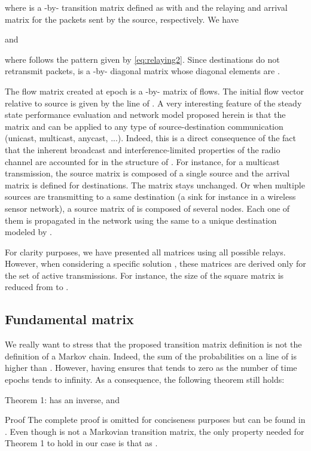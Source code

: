 \documentclass[a4paper]{article}
\begin{document}
       
\noindent where  is a -by- transition matrix defined as  with  and  the relaying and arrival matrix for the packets sent by the source, respectively. We have 
       
\noindent and 
       
\noindent where  follows the pattern given by \eqref{eq:relaying2}. Since destinations do not retransmit packets,  is a -by- diagonal matrix whose diagonal elements are .

The flow matrix  created at epoch  is a -by- matrix of flows. The initial flow vector  relative to source  is given by the  line of . 
A very interesting feature of the steady state performance evaluation and network model proposed herein is that the matrix  and  can be applied to any type of source-destination communication (unicast, multicast, anycast, ...). Indeed, this is a direct consequence of the fact that the inherent broadcast and interference-limited properties of the radio channel are accounted for in the structure of .  
For instance, for a multicast transmission, the source matrix  is composed of a single source and the arrival matrix   is defined for   destinations. The matrix  stays unchanged.
Or when multiple sources are transmitting to a same destination (a sink for instance in a wireless sensor network), a source matrix of  is composed of several nodes. Each one of them is propagated in the network using the same  to a unique destination modeled by .  

For clarity purposes, we have presented all matrices using all  possible relays. However, when considering a specific solution , these matrices are derived only for the set  of active transmissions. For instance, the size of the square matrix  is reduced from  to .  

\subsection{Fundamental matrix}

We really want to stress that the proposed transition matrix definition is not the definition of a Markov chain. Indeed, the sum of the probabilities on a line of  is higher than . However, having  ensures that  tends to zero as the number of time epochs  tends to infinity. 
As a consequence, the following theorem still holds:

{\sc Theorem 1:}  has an inverse, and


{\sc Proof}
The complete proof is omitted for conciseness purposes but can be found in \cite{markov}. Even though  is not a Markovian transition matrix, the only property needed for Theorem 1 to hold in our case is that  as . 
\end{document}
